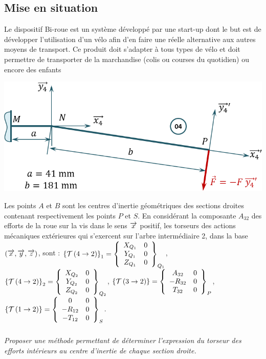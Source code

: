 \documentclass[10pt,fleqn]{article} %
\begin{document}

\vspace{4.5cm}
\pagestyle{fancy}
\thispagestyle{plain}


\def\columnseprulecolor{\color{ocre}}
\setlength{\columnseprule}{0.4pt} 

\begin{multicols}{2}
\section*{Mise en situation}
Le dispositif Bi-roue est un système développé par une start-up dont le but est de développer l’utilisation d’un vélo afin d’en faire une réelle alternative aux autres moyens de transport. Ce produit doit s’adapter à tous types de vélo et doit permettre de transporter de la marchandise (colis ou courses du quotidien) ou encore des enfants

\begin{center}
\includegraphics[width=\linewidth]{images/fig_03}
\end{center}

Les points $A$ et $B$ sont les centres d’inertie géométriques des sections droites contenant
respectivement les points $P$ et $S$.
En considérant la composante $A_{32}$ des efforts de la roue sur la vis dans le sens $\vect{x}$ positif, les
torseurs des actions mécaniques extérieures qui s’exercent sur l’arbre intermédiaire 2, dans la base
$\base{x}{y}{z}$, sont :
\footnotesize
$\torseurstat{T}{4}{2}_1 = \torseurcol{X_{Q_1}}{Y_{Q_1}}{Z_{Q_1}}{0}{0}{0}{Q_1}$, 
$\torseurstat{T}{4}{2}_2 = \torseurcol{X_{Q_2}}{Y_{Q_2}}{Z_{Q_2}}{0}{0}{0}{Q_2}$, 
$\torseurstat{T}{3}{2} = \torseurcol{A_{32}}{-R_{32}}{T_{32}}{0}{0}{0}{P}$, 
$\torseurstat{T}{1}{2} = \torseurcol{0}{-R_{12}}{-T_{12}}{0}{0}{0}{S}$.

\normalsize 

\subparagraph{}\textit{Proposer une méthode permettant de déterminer l'expression du torseur des efforts intérieurs au centre d'inertie de chaque section droite.}


\end{multicols}
\end{document}
